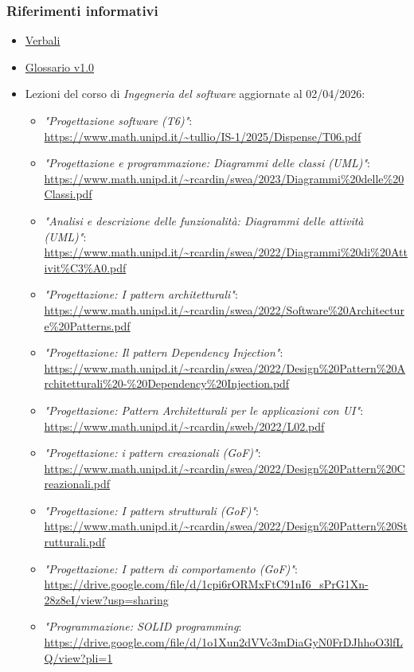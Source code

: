 \documentclass[a4paper,10pt]{article}
\begin{document}
\subsubsection{Riferimenti informativi}
\begin{itemize}
  \item \href{https://tool-8.github.io/Documentazione-SWE/}{Verbali}
  \item \href{https://tool-8.github.io/Documentazione-SWE/glossario/Glossario.pdf}{Glossario v1.0}
  \item Lezioni del corso di \textit{Ingegneria del software} aggiornate al 02/04/2026:
  \begin{itemize}
    \item \textit{"Progettazione software (T6)"}: \\ \url{https://www.math.unipd.it/~tullio/IS-1/2025/Dispense/T06.pdf}
    \item \textit{"Progettazione e programmazione: Diagrammi delle classi (UML)"}: \\ \url{https://www.math.unipd.it/~rcardin/swea/2023/Diagrammi%20delle%20Classi.pdf}
    \item \textit{"Analisi e descrizione delle funzionalità: Diagrammi delle attività (UML)"}: \\ \url{https://www.math.unipd.it/~rcardin/swea/2022/Diagrammi%20di%20Attivit%C3%A0.pdf}
    \item \textit{"Progettazione: I pattern architetturali"}: \\ \url{https://www.math.unipd.it/~rcardin/swea/2022/Software%20Architecture%20Patterns.pdf}
    \item \textit{"Progettazione: Il pattern Dependency Injection"}: \\ \url{https://www.math.unipd.it/~rcardin/swea/2022/Design%20Pattern%20Architetturali%20-%20Dependency%20Injection.pdf}
    \item \textit{"Progettazione: Pattern Architetturali per le applicazioni con UI"}: \\ \url{https://www.math.unipd.it/~rcardin/sweb/2022/L02.pdf}
    \item \textit{"Progettazione: i pattern creazionali (GoF)"}: \\ \url{https://www.math.unipd.it/~rcardin/swea/2022/Design%20Pattern%20Creazionali.pdf}
    \item \textit{"Progettazione: I pattern strutturali (GoF)"}: \\ \url{https://www.math.unipd.it/~rcardin/swea/2022/Design%20Pattern%20Strutturali.pdf}
    \item \textit{"Progettazione: I pattern di comportamento (GoF)"}: \\ \url{https://drive.google.com/file/d/1cpi6rORMxFtC91nI6_sPrG1Xn-28z8eI/view?usp=sharing}
    \item \textit{"Programmazione: SOLID programming}: \\ \url{https://drive.google.com/file/d/1o1Xun2dVVc3mDiaGyN0FrDJhhoO3lfLQ/view?pli=1}
  \end{itemize}
\end{itemize}
\end{document}
